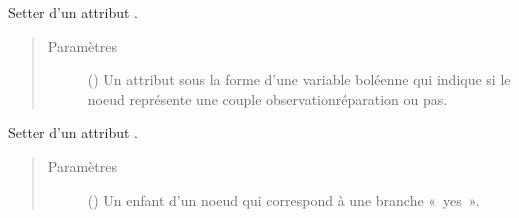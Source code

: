 \documentclass[letterpaper,10pt,french]{sphinxmanual}
\begin{document}
\begin{fulllineitems}
\begin{fulllineitems}
\begin{quote}
\begin{description}
\end{description}\end{quote}

\end{fulllineitems}


\begin{fulllineitems}
\label{\detokenize{index:StrategyTree.Observation.set_obs_rep_couples}}
Setter d’un attribut .
\begin{quote}\begin{description}
\item[{Paramètres}] \leavevmode
{} () \textendash{} Un attribut sous la forme d’une variable boléenne qui indique si le noeud représente une couple
observation\sphinxhyphen{}réparation ou pas.

\end{description}\end{quote}

\end{fulllineitems}


\begin{fulllineitems}
\label{\detokenize{index:StrategyTree.Observation.set_yes_child}}
Setter d’un attribut .
\begin{quote}\begin{description}
\item[{Paramètres}] \leavevmode
{} ({\hyperref[\detokenize{index:StrategyTree.NodeST}]{}}\sphinxstyleliteralemphasis{\sphinxupquote{, }}) \textendash{} Un enfant d’un noeud qui correspond à une branche « yes ».

\end{description}\end{quote}

\end{fulllineitems}


\end{fulllineitems}
\end{document}
